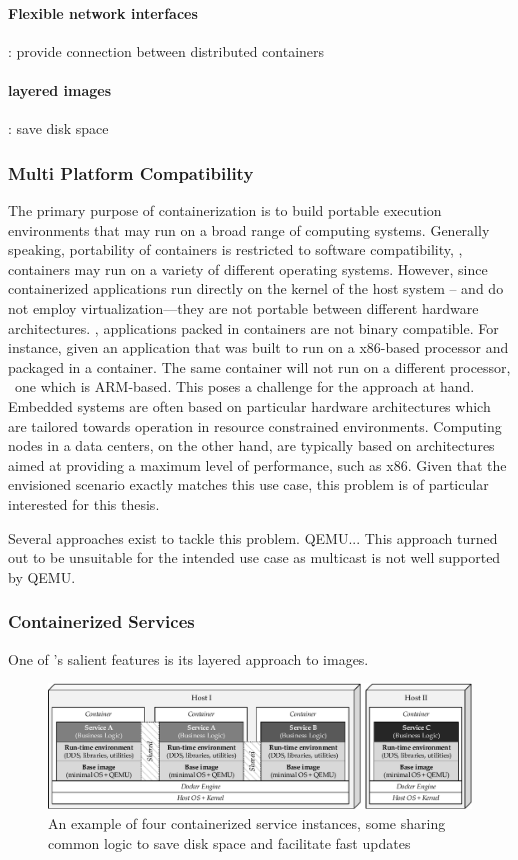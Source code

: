 \paragraph{Flexible network interfaces}: provide connection between distributed containers

\paragraph{layered images}: save disk space


\subsubsection{Multi Platform Compatibility} 
The primary purpose of containerization is to build portable execution environments that may run on a broad range of computing systems. Generally speaking, portability of containers is restricted to software compatibility, \ie , containers may run on a variety of different operating systems. However, since containerized applications run directly on the kernel of the host system -- and do not employ virtualization---they are not portable between different hardware architectures. \Ie , applications packed in containers are not binary compatible. For instance, given an application that was built to run on a x86-based processor and packaged in a container. The same container will not run on a different processor, \eg\ one which is ARM-based. This poses a challenge for the approach at hand. Embedded systems are often based on particular hardware architectures which are tailored towards operation in resource constrained environments. Computing nodes in a data centers, on the other hand, are typically based on architectures aimed at providing a maximum level of performance, such as x86. Given that the envisioned scenario exactly matches this use case, this problem is of particular interested for this thesis.

Several approaches exist to tackle this problem. QEMU... This approach turned out to be unsuitable for the intended use case as multicast is not well supported by QEMU.


\subsubsection{Containerized Services}
One of \docker 's salient features is its layered approach to images.

\begin{figure}[htpb]
  \centering
  \includegraphics[width=\textwidth]{figures/docker-sharing}
  \caption[An example of containerized services]{An example of four containerized service instances, some sharing common logic to save disk space and facilitate fast updates}\label{fig:service-containers} 
\end{figure}

